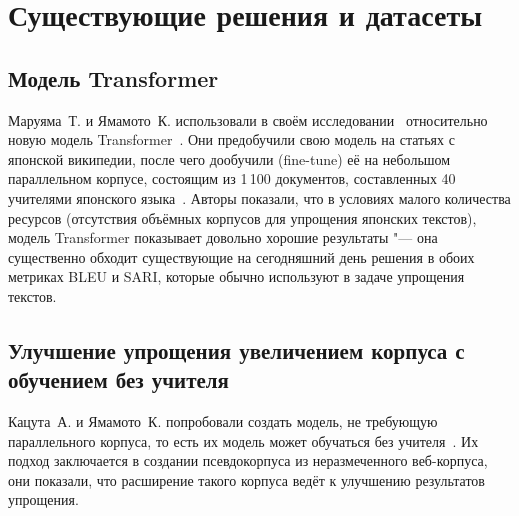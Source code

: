 

\chapter{Существующие решения и датасеты}\label{ch2}






\section{Модель Transformer}


Маруяма~Т. и Ямамото~К. использовали в своём исследовании~\cite{Transformer2019} относительно новую модель Transformer~\cite{vaswani2017attention}.
Они предобучили свою модель на статьях с японской википедии, после чего дообучили (fine-tune) её на небольшом параллельном корпусе, состоящим из 1\,100 документов, составленных 40 учителями японского языка~\cite{moku-yamamoto-2012-automatic}.
Авторы показали, что в условиях малого количества ресурсов (отсутствия объёмных корпусов для упрощения японских текстов), модель Transformer показывает довольно хорошие результаты "--- она существенно обходит существующие на сегодняшний день решения в обоих метриках BLEU и SARI, которые обычно используют в задаче упрощения текстов.


\section{Улучшение упрощения увеличением корпуса с обучением без учителя}


Кацута~А. и Ямамото~К. попробовали создать модель, не требующую параллельного корпуса, то есть их модель может обучаться без учителя~\cite{Unsupervised2019}.
Их подход заключается в создании псевдокорпуса из неразмеченного веб-корпуса, они показали, что расширение такого корпуса ведёт к улучшению результатов упрощения.


